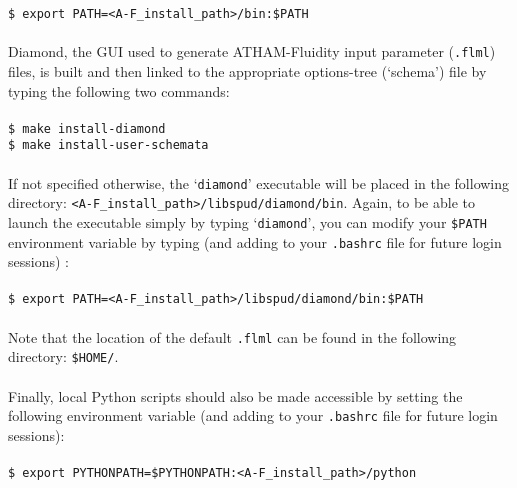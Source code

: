 \documentclass[10pt,a4paper]{article}
\newcommand\tab[1][0.5cm]{\hspace*{#1}}
\begin{document}
\tab \texttt{\$ export PATH=<A-F\_install\_path>/bin:\$PATH }\\\\
Diamond, the GUI used to generate ATHAM-Fluidity input parameter (\texttt{.flml}) files, is built and then linked to the appropriate options-tree (`schema') file by typing the following two commands:\\\\
\tab \texttt{\$ make install-diamond}\\
\tab \texttt{\$ make install-user-schemata}\\\\
If not specified otherwise, the `\texttt{diamond}' executable will be placed in the following directory: \texttt{<A-F\_install\_path>/libspud/diamond/bin}. Again, to be able to launch the executable simply by typing `\texttt{diamond}', you can modify your \texttt{\$PATH} environment variable by typing (and adding to your \texttt{.bashrc} file for future login sessions) :\\\\
\tab \texttt{\$ export PATH=<A-F\_install\_path>/libspud/diamond/bin:\$PATH }\\\\
Note that the location of the default \texttt{.flml} can be found in the following directory: \texttt{\$HOME/}.\\\\
Finally, local Python scripts should also be made accessible by setting the following environment variable (and adding to your \texttt{.bashrc} file for future login sessions):\\\\
\tab \texttt{\$ export PYTHONPATH=\$PYTHONPATH:<A-F\_install\_path>/python}
\end{document}
